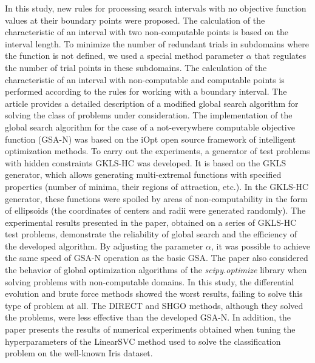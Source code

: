 \documentclass[a4paper,12pt,russian]{article}
\begin{document}
\begin{small}
In this study, new rules for processing search intervals with no objective function values at their boundary points were proposed. The calculation of the characteristic of an interval with two non-computable points is based on the interval length. To minimize the number of redundant trials in subdomains where the function is not defined, we used a special method parameter $\alpha$ that regulates the number of trial points in these subdomains. The calculation of the characteristic of an interval with non-computable and computable points is performed according to the rules for working with a boundary interval. The article provides a detailed description of a modified global search algorithm for solving the class of problems under consideration.
The implementation of the global search algorithm for the case of a not-everywhere computable objective function (GSA-N) was based on the iOpt open source framework of intelligent optimization methods.
To carry out the experiments, a generator of test problems with hidden constraints GKLS-HC was developed. It is based on the GKLS generator, which allows generating multi-extremal functions with specified properties (number of minima, their regions of attraction, etc.). In the GKLS-HC generator, these functions were spoiled by areas of non-computability in the form of ellipsoids (the coordinates of centers and radii were generated randomly).
The experimental results presented in the paper, obtained on a series of GKLS-HC test problems, demonstrate the reliability of global search and the efficiency of the developed algorithm. By adjusting the parameter $\alpha$, it was possible to achieve the same speed of GSA-N operation as the basic GSA.
The paper also considered the behavior of global optimization algorithms of the \textit{scipy.optimize} library when solving problems with non-computable domains. In this study, the differential evolution and brute force methods showed the worst results, failing to solve this type of problem at all. The DIRECT and SHGO methods, although they solved the problems, were less effective than the developed GSA-N.
In addition, the paper presents the results of numerical experiments obtained when tuning the hyperparameters of the LinearSVC method used to solve the classification problem on the well-known Iris dataset.


\end{small}
\end{document}
